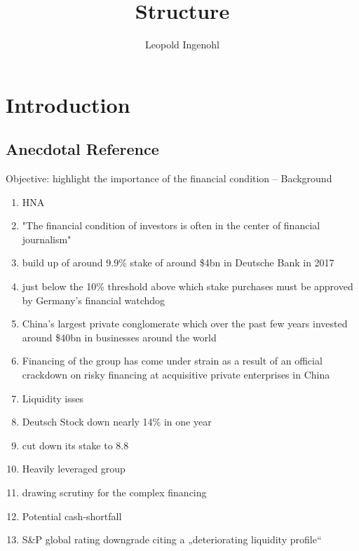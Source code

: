 \documentclass[12pt]{article}
\title{Structure}
\author{Leopold Ingenohl}
\begin{document}
\maketitle

\section{Introduction}

\subsection{Anecdotal Reference}
\begin{center} 
Objective: highlight the importance of the financial condition -- Background
\end{center}

    \begin{enumerate}
        \item HNA
        \item "The financial condition of investors is often in the center of financial journalism"

        \item build up of around 9.9\% stake of around \$4bn in Deutsche Bank in 2017 
        \item just below the 10\% threshold above which stake purchases must be approved by Germany’s financial watchdog 
        \item China’s largest private conglomerate which over the past few years invested around \$40bn in businesses around the world 
        \item Financing of the group has come under strain as a result of an official crackdown on risky financing at acquisitive private enterprises in China 
        \item Liquidity isses 
        \item Deutsch Stock down nearly 14\% in one year

        \item cut down its stake to 8.8%
        \item Heavily leveraged group
        \item drawing scrutiny for the complex financing

        \item Potential cash-shortfall
        \item S\&P global rating downgrade citing a „deteriorating liquidity profile“
    \end{enumerate}
\end{document}
